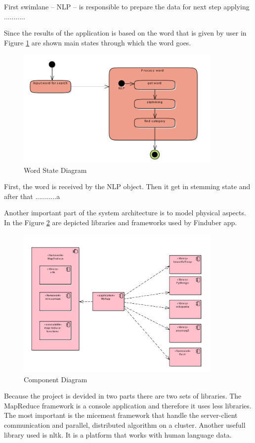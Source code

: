 First swimlane -- NLP -- is responsible to prepare the data for next step applying ...........


Since the results of the application is based on the word that is given by user in Figure \ref{state_uml} are shown main states through which the word goes. 

\begin{figure}[!ht]
\centering
\includegraphics[width=10cm]{wordstate}
\caption{Word State Diagram}\label{state_uml}
\end{figure}

First, the word is received by the NLP object. Then it get in stemming state and after that ...........a


Another important part of the system architecture is to model physical aspects. In the Figure \ref{component_uml} are depicted libraries and frameworks used by Finduber app.
 
\begin{figure}[!ht]
\centering
\includegraphics[width=10cm]{Component}
\caption{Component Diagram}\label{component_uml}
\end{figure}

Because the project is devided in two parts there are two sets of libraries. The MapReduce framework is a console application and therefore it uses less libraries. The most important is the micemeat framework that handle the server-client communication and parallel, distributed algorithm on a cluster. Another usefull library used is nltk. It is a platform that works with human language data. 

